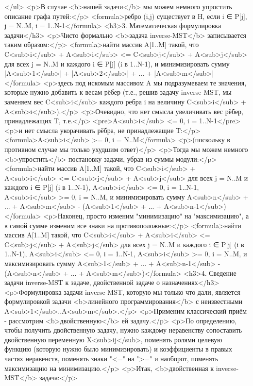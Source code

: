 </ul>
<p>В случае <b>нашей задачи</b> мы можем немного упростить описание графа путей:</p>
<formula>ребро (i,j) существует в H, если i ∈ P[j],  j = N..M, i = 1..N-1</formula>
<h3>3. Математическая формулировка задачи</h3>
<p>Чисто формально <b>задача inverse-MST</b> записывается таким образом:</p>
<formula>найти массив A[1..M] такой, что
C<sub>i</sub> + A<sub>i</sub> <= C<sub>j</sub> + A<sub>j</sub> для всех j = N..M и каждого i ∈ P[j] (i в 1..N-1),
и минимизировать сумму |A<sub>1</sub>| + |A<sub>2</sub>| + ... + |A<sub>m</sub>|</formula>
<p>здесь под искомым массивом A мы подразумеваем те значения, которые нужно добавить к весам рёбер (т.е., решив задачу inverse-MST, мы заменяем вес C<sub>i</sub> каждого ребра i на величину C<sub>i</sub> + A<sub>i</sub>).</p>
<p>Очевидно, что нет смысла увеличивать вес рёбер, принадлежащих T, т.е.</p>
<pre>A<sub>i</sub> <= 0,  i = 1..N-1</pre>
<p>и нет смысла укорачивать рёбра, не принадлежащие T:</p>
<formula>A<sub>i</sub> >= 0,  i = N..M</formula>
<p>(поскольку в противном случае мы только ухудшим ответ)</p>
<p>Тогда мы можем немного <b>упростить</b> постановку задачи, убрав из суммы модули:</p>
<formula>найти массив A[1..M] такой, что
C<sub>i</sub> + A<sub>i</sub> <= C<sub>j</sub> + A<sub>j</sub> для всех j = N..M и каждого i ∈ P[j] (i в 1..N-1),
A<sub>i</sub> <= 0,  i = 1..N-1,
A<sub>i</sub> >= 0,  i = N..M,
и минимизировать сумму A<sub>n</sub> + ... + A<sub>m</sub> - (A<sub>1</sub> + ... + A<sub>n-1</sub>)</formula>
<p>Наконец, просто изменим "минимизацию" на "максимизацию", а в самой сумме изменим все знаки на противоположные:</p>
<formula>найти массив A[1..M] такой, что
C<sub>i</sub> + A<sub>i</sub> <= C<sub>j</sub> + A<sub>j</sub> для всех j = N..M и каждого i ∈ P[j] (i в 1..N-1),
A<sub>i</sub> <= 0,  i = 1..N-1,
A<sub>i</sub> >= 0,  i = N..M,
и максимизировать сумму A<sub>1</sub> + ... + A<sub>n-1</sub> - (A<sub>n</sub> + ... + A<sub>m</sub>)</formula>
<h3>4. Сведение задачи inverse-MST к задаче, двойственной задаче о назначениях</h3>
<p>Формулировка задачи inverse-MST, которую мы только что дали, является формулировкой задачи <b>линейного программирования</b> с неизвестными A<sub>1</sub>..A<sub>m</sub>.</p>
<p>Применим классический приём - рассмотрим <b>двойственную</b> ей задачу.</p>
<p>По определению, чтобы получить двойственную задачу, нужно каждому неравенству сопоставить двойственную переменную X<sub>ij</sub>, поменять ролями целевую функцию (которую нужно было минимизировать) и коэффициенты в правых частях неравенств, поменять знаки "<=" на ">=" и наоборот, поменять максимизацию на минимизацию.</p>
<p>Итак, <b>двойственная к inverse-MST</b> задача:</p>
